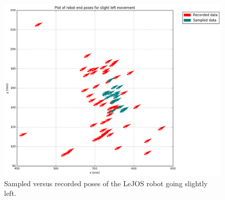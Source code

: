 \documentclass[paper=a4, fontsize=11pt]{scrartcl} %
\begin{document}
    \begin{figure}[H]
        \centering
        \includegraphics[width=1\textwidth]{images/poses_compare_slightLeft.png}
        \caption{Sampled versus recorded poses of the LeJOS robot going slightly left.}
    \end{figure}
\end{document}
